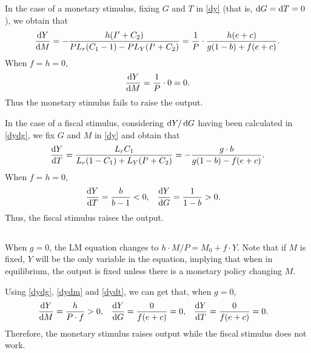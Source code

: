 \documentclass{article}
\begin{document}
In the case of a monetary stimulus, fixing $G$ and $T$ in \eqref{dy} (that is, $\dif G = \dif T = 0$), we obtain that
\begin{equation}
    \frac{\dif Y}{\dif M} = -\frac{h (I' + C_2)}{P L_r(C_1 - 1) - P L_Y (I' + C_2)}
    = \frac{1}{P} \cdot \frac{h (e + c)}{g (1 - b) + f (e + c)}. \label{dydm}
\end{equation}
When $f = h = 0$,
\[
    \frac{\dif Y}{\dif M} = \frac{1}{P} \cdot 0 = 0.
\]
Thus the monetary stimulus fails to raise the output.

In the case of a fiscal stimulus, considering $\dif Y / \dif G$ having been calculated in \eqref{dydg}, we fix $G$ and $M$ in \eqref{dy} and obtain that
\begin{equation}
    \frac{\dif Y}{\dif T} = \frac{L_r C_1}{L_r(1 - C_1) + L_Y (I' + C_2)} = -\frac{g \cdot b}{g (1 - b) - f(e + c)}. \label{dydt}
\end{equation}
When $f = h = 0$,
\begin{align*}
    \frac{\dif Y}{\dif T} &= \frac{b}{b - 1} < 0, &
    \frac{\dif Y}{\dif G} &= \frac{1}{1 - b} > 0.
\end{align*}
Thus, the fiscal stimulus raises the output.

\subsection{}
When $g = 0$, the LM equation changes to $h \cdot M / P = M_0 + f \cdot Y$. Note that if $M$ is fixed, $Y$ will be the only variable in the equation, implying that when in equilibrium, the output is fixed unless there is a monetary policy changing  $M$.

Using \eqref{dydg}, \eqref{dydm} and \eqref{dydt}, we can get that, when $g = 0$,
\begin{align*}
    \frac{\dif Y}{\dif M} &= \frac{h}{P \cdot f} > 0, &
    \frac{\dif Y}{\dif G} &= \frac{0}{f (e+c)} = 0, &
    \frac{\dif Y}{\dif T} &= \frac{0}{f (e+c)} = 0.
\end{align*}
Therefore, the monetary stimulus raises output while the fiscal stimulus does not work.
\end{document}
